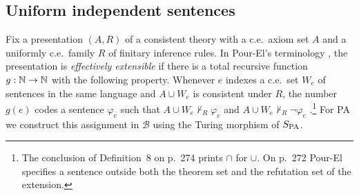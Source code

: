 \subsection{Uniform independent sentences}
\label{subsec:uniform-independent-sentences}

Fix a presentation $(A,R)$ of a consistent theory with a c.e.\ axiom
set $A$ and a uniformly c.e.\ family $R$ of finitary inference rules.
In Pour-El's terminology \cite{PourEl}, the presentation is
\emph{effectively extensible} if there is a total recursive function $g:\mathbb N\to\mathbb N$ with the following
property. Whenever $e$ indexes a c.e.\ set $W_e$ of sentences in the
same language and $A\cup W_e$ is consistent under $R$, the number
$g(e)$ codes a sentence $\varphi_e$ such that
$A\cup W_e\nvdash_R\varphi_e$ and $A\cup W_e\nvdash_R\neg\varphi_e$
\cite[pp.~272, 274, Definitions~5, 6(b) and~8]{PourEl1970}.\footnote{The
conclusion of Definition~8 on p.~274 prints $\cap$ for $\cup$. On
p.~272 Pour-El specifies a sentence outside both the theorem set and
the refutation set of the extension.}
For PA we construct this assignment in
$\mathcal B$ using the Turing morphism of $S_{\mathrm{PA}}$.

